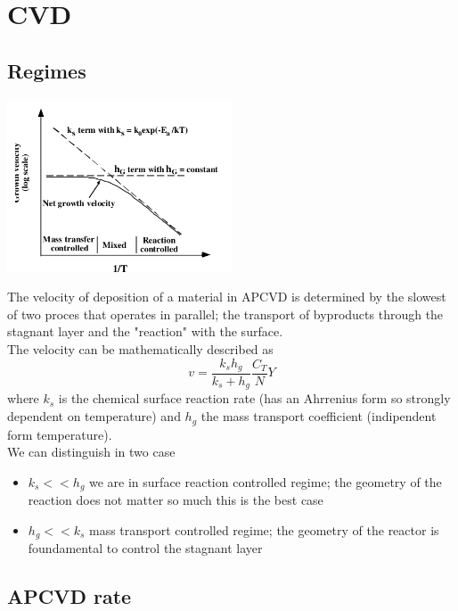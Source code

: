 
\section{CVD}

\subsection{Regimes}

\centering
\includegraphics[width=0.5\textwidth]{CVD.png}\\
\raggedright

The velocity of deposition of a material in APCVD is determined by the slowest of two proces that operates in parallel; the transport of byproducts through the stagnant layer and the "reaction" with the surface.\\
The velocity can be mathematically described as 
\begin{equation}
v=\frac{k_sh_g}{k_s+h_g}\frac{C_T}{N}Y
\end{equation}
where $k_s$ is the chemical surface reaction rate (has an Ahrrenius form so strongly dependent on temperature) and $h_g$ the mass transport coefficient (indipendent form temperature).\\
We can distinguish in two case 
\begin{itemize}
\item $k_s<<h_g$ we are in surface reaction controlled regime; the geometry of the reaction does not matter so much this is the best case
\item $h_g<<k_s$ mass transport controlled regime; the geometry of the reactor is foundamental to control the stagnant layer 
\end{itemize}




\subsection{APCVD rate}

